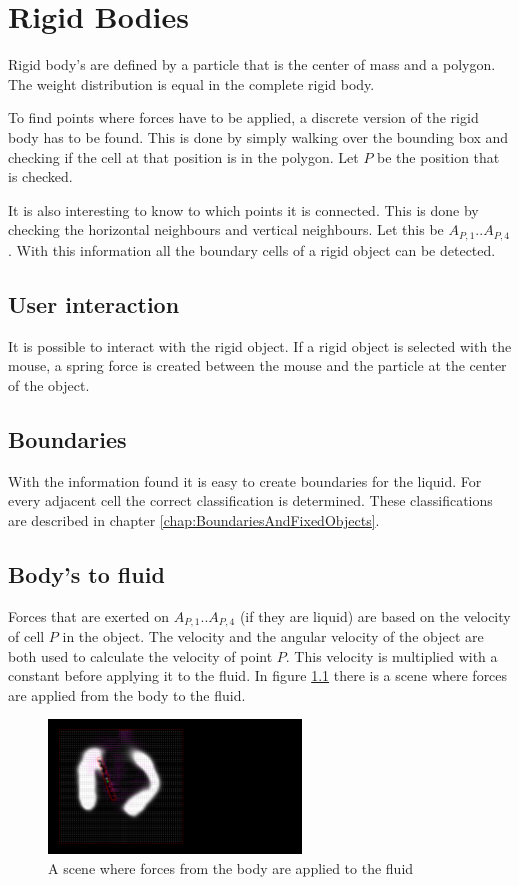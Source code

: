 \chapter{Rigid Bodies}
Rigid body's are defined by a particle that is the center of mass and a polygon. The weight distribution is equal in the complete rigid body.

To find points where forces have to be applied, a discrete version of the rigid body has to be found. This is done by simply walking over the bounding box and checking if the cell at that position is in the polygon. Let $P$ be the position that is checked.

It is also interesting to know to which points it is connected. This is done by checking the horizontal neighbours and vertical neighbours. Let this be $A_{P,1} .. A_{P,4}$. With this information all the boundary cells of a rigid object can be detected.

\section{User interaction}
It is possible to interact with the rigid object. If a rigid object is selected with the mouse, a spring force is created between the mouse and the particle at the center of the object.

\section{Boundaries}
With the information found it is easy to create boundaries for the liquid. For every adjacent cell the correct classification is determined. These classifications are described in chapter \ref{chap:BoundariesAndFixedObjects}.

\section{Body's to fluid}
Forces that are exerted on $A_{P,1} .. A_{P,4}$ (if they are liquid) are based on the velocity of cell $P$ in the object. The velocity  and the angular velocity of the object are both used to calculate the velocity of point $P$. This velocity is multiplied with a constant before applying it to the fluid. In figure \ref{fig:BodyToFluid} there is a scene where forces are applied from the body to the fluid.

\begin{figure}[htb!]
    \centering
    \includegraphics[width=0.6\textwidth]{images/BodyToFluid}
    \caption{A scene where forces from the body are applied to the fluid}
    \label{fig:BodyToFluid}
\end{figure}

